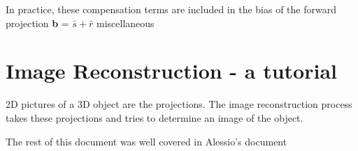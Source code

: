 \documentclass{article}
\begin{document}
In practice, these compensation terms are included in the bias of the forward projection \textbf{b} = $\bar{s} +\bar{r}$ miscellaneous






\newpage
\section{Image Reconstruction - a tutorial} \cite{Zeng2001}

2D pictures of a 3D object are the projections. The image reconstruction process takes these projections and tries to determine an image of the object.  

The rest of this document was well covered in Alessio's document \cite{Alessio2006} 








\newpage

 

\end{document}

